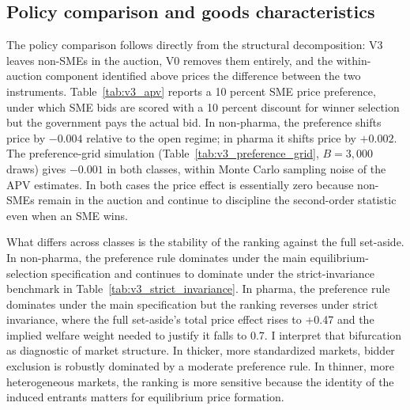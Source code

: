 \subsection{Policy comparison and goods characteristics}\label{sec:pareto}

The policy comparison follows directly from the structural decomposition: V3 leaves non-SMEs in the auction, V0 removes them entirely, and the within-auction component identified above prices the difference between the two instruments. Table~\ref{tab:v3_apv} reports a 10 percent SME price preference, under which SME bids are scored with a 10 percent discount for winner selection but the government pays the actual bid. In non-pharma, the preference shifts price by $-0.004$ relative to the open regime; in pharma it shifts price by $+0.002$. The preference-grid simulation (Table~\ref{tab:v3_preference_grid}, $B = 3{,}000$ draws) gives $-0.001$ in both classes, within Monte Carlo sampling noise of the APV estimates. In both cases the price effect is essentially zero because non-SMEs remain in the auction and continue to discipline the second-order statistic even when an SME wins.

What differs across classes is the stability of the ranking against the full set-aside. In non-pharma, the preference rule dominates under the main equilibrium-selection specification and continues to dominate under the strict-invariance benchmark in Table~\ref{tab:v3_strict_invariance}. In pharma, the preference rule dominates under the main specification but the ranking reverses under strict invariance, where the full set-aside's total price effect rises to +0.47 and the implied welfare weight needed to justify it falls to 0.7. I interpret that bifurcation as diagnostic of market structure. In thicker, more standardized markets, bidder exclusion is robustly dominated by a moderate preference rule. In thinner, more heterogeneous markets, the ranking is more sensitive because the identity of the induced entrants matters for equilibrium price formation.

